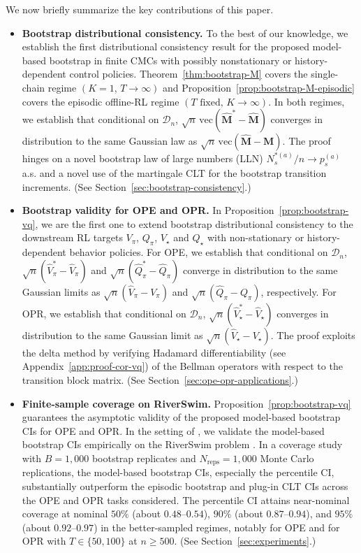 \documentclass{article}
\numberwithin{equation}{section}
\begin{document}
We now briefly summarize the key contributions of this paper.
\begin{itemize}
    \item \textbf{Bootstrap distributional consistency.}
    To the best of our knowledge, we establish the first distributional consistency result for the proposed model-based bootstrap in finite CMCs with possibly nonstationary or history-dependent control policies.
    Theorem~\ref{thm:bootstrap-M} covers the single-chain regime $(K=1,\,T\to\infty)$ and Proposition~\ref{prop:bootstrap-M-episodic} covers the episodic offline-RL regime $(T\text{ fixed},\,K\to\infty)$. 
    In both regimes, we establish that conditional on $\mathcal{D}_n$, $\sqrt{n}\,\mathrm{vec}(\hat{\mathbf{M}}^\ast-\hat{\mathbf{M}})$ converges in distribution to the same Gaussian law as $\sqrt{n}\,\mathrm{vec}(\hat{\mathbf{M}}-\mathbf{M})$.
    The proof hinges on a novel bootstrap law of large numbers (LLN) $N_s^{\ast(a)}/n\to p_s^{(a)}$ a.s. and a novel use of the martingale CLT for the bootstrap transition increments.
    (See Section~\ref{sec:bootstrap-consistency}.)

    \item \textbf{Bootstrap validity for OPE and OPR.}
    In Proposition~\ref{prop:bootstrap-vq}, we are the first one to extend bootstrap distributional consistency to the downstream RL targets $V_\pi$, $Q_\pi$, $V_\star$ and $Q_\star$ with non-stationary or history-dependent behavior policies.
    For OPE, we establish that conditional on $\mathcal{D}_n$, $\sqrt{n}(\hat V_\pi^\ast - \hat V_\pi)$ and $\sqrt{n}(\hat Q_\pi^\ast - \hat Q_\pi)$ converge in distribution to the same Gaussian limits as $\sqrt{n}(\hat V_\pi - V_\pi)$ and $\sqrt{n}(\hat Q_\pi - Q_\pi)$, respectively. 
    For OPR, we establish that conditional on $\mathcal{D}_n$, $\sqrt{n}(\hat V_\star^\ast - \hat V_\star)$ converges in distribution to the same Gaussian limit as $\sqrt{n}(\hat V_\star - V_\star)$.
    The proof exploits the delta method by verifying Hadamard differentiability (see Appendix~\ref{app:proof-cor-vq}) of the Bellman operators with respect to the transition block matrix.
    (See Section~\ref{sec:ope-opr-applications}.)

    \item \textbf{Finite-sample coverage on RiverSwim.}
    Proposition~\ref{prop:bootstrap-vq} guarantees the asymptotic validity of the proposed model-based bootstrap CIs for OPE and OPR. 
    In the setting of \citet{zhu2024uncertainty}, we validate the model-based bootstrap CIs empirically on the RiverSwim problem \citep{strehl2004empirical}.
    In a coverage study with $B=1{,}000$ bootstrap replicates and $N_{\mathrm{reps}}=1{,}000$ Monte Carlo replications, the  model-based bootstrap CIs, especially the percentile CI, substantially outperform the episodic bootstrap and plug-in CLT CIs across the OPE and OPR tasks considered.
    The percentile CI attains near-nominal coverage at nominal $50\%$ (about $0.48$--$0.54$), $90\%$ (about $0.87$--$0.94$), and $95\%$ (about $0.92$--$0.97$) in the better-sampled regimes, notably for OPE and for OPR with $T\in\{50,100\}$ at $n\ge 500$.
    (See Section~\ref{sec:experiments}.)
\end{itemize}
\end{document}
